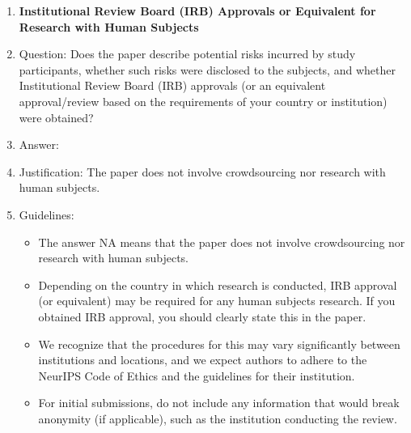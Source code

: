\documentclass{article}
\begin{document}
\begin{enumerate}
\item {\bf Institutional Review Board (IRB) Approvals or Equivalent for Research with Human Subjects}
    \item[] Question: Does the paper describe potential risks incurred by study participants, whether such risks were disclosed to the subjects, and whether Institutional Review Board (IRB) approvals (or an equivalent approval/review based on the requirements of your country or institution) were obtained?
    \item[] Answer: \answerNA{} %
    \item[] Justification: The paper does not involve crowdsourcing nor research with human subjects.
    \item[] Guidelines:
    \begin{itemize}
        \item The answer NA means that the paper does not involve crowdsourcing nor research with human subjects.
        \item Depending on the country in which research is conducted, IRB approval (or equivalent) may be required for any human subjects research. If you obtained IRB approval, you should clearly state this in the paper. 
        \item We recognize that the procedures for this may vary significantly between institutions and locations, and we expect authors to adhere to the NeurIPS Code of Ethics and the guidelines for their institution. 
        \item For initial submissions, do not include any information that would break anonymity (if applicable), such as the institution conducting the review.
    \end{itemize}

\end{enumerate}
 \fi
\end{document}
